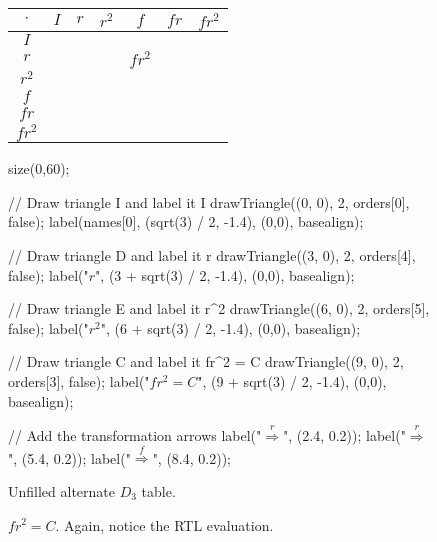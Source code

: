 \documentclass[../textbook.tex]{subfiles}
\begin{document}
\begin{figure}[h]
	\begin{center}
		\begin{minipage}[b]{0.35\textwidth}
			\centering
			\begin{tabular}{c|cccccc}
				\hline
				$\cdot$ & $I$ & $r$ & $r^2$ & $f$ & $fr$ & $fr^2$ \\ \hline
				\rowcolor{light-gray}
				$I$    &   &   &   &   &   &   \\
				$r$    &   &   &   & $fr^2$  &   &   \\
				\rowcolor{light-gray}
				$r^2$    &   &   &   &   &   &   \\
				$f$    &   &   &   &   &   &   \\
				\rowcolor{light-gray}
				$fr$    &   &   &   &   &   &   \\
				$fr^2$    &   &   &   &   &   &   \\ \hline
			\end{tabular}
			\vspace*{0.5\baselineskip}
		\end{minipage}
		\hfill
		\begin{minipage}[b]{0.55\textwidth}
			\centering
			\begin{asy}[width=\textwidth]
			size(0,60);

			// Draw triangle I and label it I
			drawTriangle((0, 0), 2, orders[0], false);
			label(names[0], (sqrt(3) / 2, -1.4), (0,0), basealign);

			// Draw triangle D and label it r
			drawTriangle((3, 0), 2, orders[4], false);
			label("$r$", (3 + sqrt(3) / 2, -1.4), (0,0), basealign);

			// Draw triangle E and label it r^2
			drawTriangle((6, 0), 2, orders[5], false);
			label("$r^2$", (6 + sqrt(3) / 2, -1.4), (0,0), basealign);

			// Draw triangle C and label it fr^2 = C
			drawTriangle((9, 0), 2, orders[3], false);
			label("$fr^2=C$", (9 + sqrt(3) / 2, -1.4), (0,0), basealign);

			// Add the transformation arrows
			label("$\stackrel{r}{\Longrightarrow}$", (2.4, 0.2));
			label("$\stackrel{r}{\Longrightarrow}$", (5.4, 0.2));
			label("$\stackrel{f}{\Longrightarrow}$", (8.4, 0.2));
			\end{asy}
		\end{minipage}
	\end{center}
	\vspace*{-2\baselineskip}
	\begin{center}
		\begin{minipage}[t]{0.35\textwidth}
			\caption{Unfilled alternate $D_3$ table.}
			\label{fig:alttable}
		\end{minipage}
		\hfill
		\begin{minipage}[t]{0.55\textwidth}
			\caption{$fr^2=C$. Again, notice the RTL evaluation.}
			\label{fig:fr2}
		\end{minipage}
	\end{center}
	\vspace*{-2\baselineskip}
\end{figure}
\end{document}
